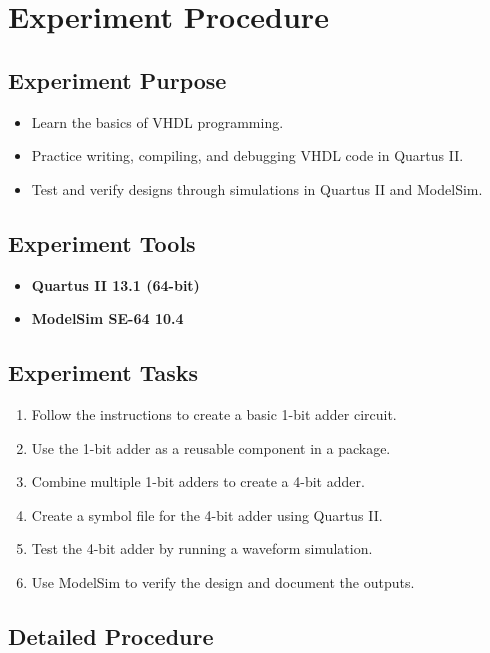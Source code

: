 \documentclass[12pt,a4paper,oneside]{ctexart}
\begin{document}
\section{Experiment Procedure}

\subsection{Experiment Purpose}
\begin{itemize}
    \item Learn the basics of VHDL programming.
    \item Practice writing, compiling, and debugging VHDL code in Quartus II.
    \item Test and verify designs through simulations in Quartus II and ModelSim.
\end{itemize}

\subsection{Experiment Tools}
\begin{itemize}
    \item \textbf{Quartus II 13.1 (64-bit)}
    \item \textbf{ModelSim SE-64 10.4}
\end{itemize}

\subsection{Experiment Tasks}
\begin{enumerate}
    \item  Follow the instructions to create a basic 1-bit adder circuit.
    \item  Use the 1-bit adder as a reusable component in a package.
    \item  Combine multiple 1-bit adders to create a 4-bit adder.
    \item  Create a symbol file for the 4-bit adder using Quartus II.
    \item  Test the 4-bit adder by running a waveform simulation.
    \item  Use ModelSim to verify the design and document the outputs.
\end{enumerate}


\subsection{Detailed Procedure}
\end{document}
